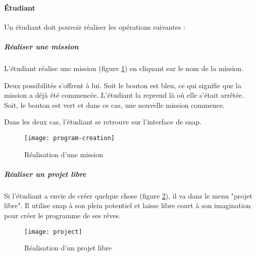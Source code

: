 \paragraph{Étudiant}
Un étudiant doit pouvoir réaliser les opérations suivantes :
\subparagraph{Réaliser une mission} L'étudiant réalise une mission (figure \ref{fig:program-creation}) en cliquant sur le nom de la mission.

Deux possibilités s'offrent à lui. Soit le bouton est bleu, ce qui signifie que la mission a déjà été commencée. L'étudiant la reprend là où elle s'était arrêtée. Soit, le bouton est vert et dans ce cas, une nouvelle mission commence.

Dans les deux cas, l'étudiant se retrouve sur l'interface de \gls{snap}.
\begin{figure}
  \begin{center}
    \texttt{[image: program-creation]}
    \caption{Réalisation d'une mission}
    \label{fig:program-creation}
  \end{center}
\end{figure}

\subparagraph{Réaliser un projet libre} Si l'étudiant a envie de créer quelque chose (figure \ref{fig:project}), il va dans le menu "projet libre". Il utilise \gls{snap} à son plein potentiel et laisse libre court à son imagination pour créer le programme de ses rêves.
\begin{figure}
  \begin{center}
    \texttt{[image: project]}
    \caption{Réalisation d'un projet libre}
    \label{fig:project}
  \end{center}
\end{figure}
